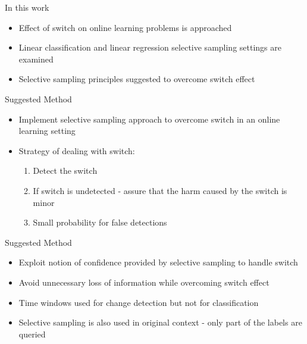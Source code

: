 \documentclass{beamer}
\begin{document}
\begin{frame}{In this work}
\begin{itemize}
\item Effect of switch on online learning problems is approached\newline
\item Linear classification and linear regression selective sampling settings are examined\newline
\item Selective sampling principles suggested to overcome switch effect\newline
\end{itemize}
\end{frame}


\begin{frame}{Suggested Method}
\begin{itemize}
\item Implement selective sampling approach to overcome switch in an online learning setting\newline
\item Strategy of dealing with switch:\newline
\begin{enumerate}
\item Detect the switch\newline
\item If switch is undetected - assure that the harm caused by the switch is minor\newline
\item Small probability for false detections
\end{enumerate}
\end{itemize}

\end{frame}

\begin{frame}{Suggested Method}
\begin{itemize}
\item Exploit notion of confidence provided by selective sampling to handle switch\newline
\item Avoid unnecessary loss of information while overcoming switch effect\newline
\item Time windows used for change detection but not for classification\newline
\item Selective sampling is also used in original context - only part of the labels are queried
\end{itemize}
\end{frame}
\end{document}
